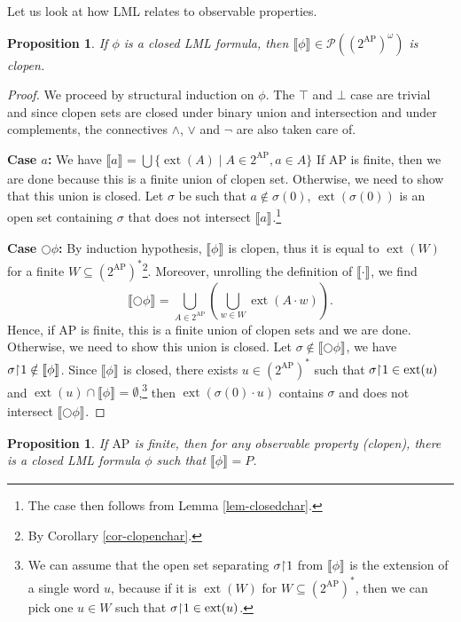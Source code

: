 \documentclass{tufte-handout} %
\newtheorem{prop}[thm]{Proposition}
\theoremstyle{definition}
\theoremstyle{remark}
\newcommand{\bra}[1]{\left(#1\right)}
\newcommand{\mP}{\mathcal{P}}
\newcommand{\0}{\textsf{0}}
\newcommand{\1}{\textsf{1}}
\newcommand{\AP}{\text{AP}}
\newcommand{\rest}[2]{#1 \kern-0.65ex\upharpoonright \kern-0.55ex #2}
\DeclareMathOperator{\ext}{ext}
\newcommand{\sem}[2]{\llbracket #1 \rrbracket_{#2}}
\begin{document}
Let us look at how LML relates to observable properties.
\begin{prop}
	If $\phi$ is a closed LML formula, then $\sem{\phi}{} \in \mP\bra{(2^{\AP})^{\omega}}$ is clopen.
\end{prop}
\begin{proof}
	We proceed by structural induction on $\phi$. The $\top$ and $\bot$ case are trivial and since clopen sets are closed under binary union and intersection and under complements, the connectives $\wedge$, $\vee$ and $\neg$ are also taken care of.
	
	\textbf{Case $a$:} We have $\sem{a}{} = \bigcup \{\ext(A) \mid A \in 2^{\AP}, a \in A\}$ If $\AP$ is finite, then we are done because this is a finite union of clopen set. Otherwise, we need to show that this union is closed. Let $\sigma$ be such that $a\notin \sigma(0)$, $\ext(\sigma(0))$ is an open set containing $\sigma$ that does not intersect $\sem{a}{}$.\footnote{The case then follows from Lemma \ref{lem-closedchar}.}
	
	\textbf{Case $\bigcirc\phi$:} By induction hypothesis, $\sem{\phi}{}$ is clopen, thus it is equal to $\ext(W)$ for a finite $W \subseteq (2^{\AP})^*$\footnote{By Corollary \ref{cor-clopenchar}.}. Moreover, unrolling the definition of $\sem{\cdot}{}$, we find \[\sem{\bigcirc\phi}{} = \bigcup_{A \in 2^{\AP}}\bra{ \bigcup_{w \in W} \ext(A\cdot w)}.\] Hence, if $\AP$ is finite, this is a finite union of clopen sets and we are done. Otherwise, we need to show this union is closed. Let $\sigma \notin \sem{\bigcirc \phi}{}$, we have $\rest{\sigma}{1}\notin \sem{\phi}{}$. Since $\sem{\phi}{}$ is closed, there exists $u \in (2^{\AP})^*$ such that $\rest{\sigma}{1} \in \ext(u)$ and $\ext(u) \cap \sem{\phi}{}= \emptyset$,\footnote{We can assume that the open set separating $\rest{\sigma}{1}$ from $\sem{\phi}{}$ is the extension of a single word $u$, because if it is $\ext(W)$ for $W\subseteq (2^{\AP})^*$, then we can pick one $u\in W$ such that $\rest{\sigma}{1} \in \ext(u)$.} then $\ext(\sigma(0)\cdot u)$ contains $\sigma$ and does not intersect $\sem{\bigcirc\phi}{}$.
\end{proof}
\begin{prop}
	If $\AP$ is finite, then for any observable property (clopen), there is a closed LML formula $\phi$ such that $\sem{\phi}{} = P$.
\end{prop}
\end{document}
